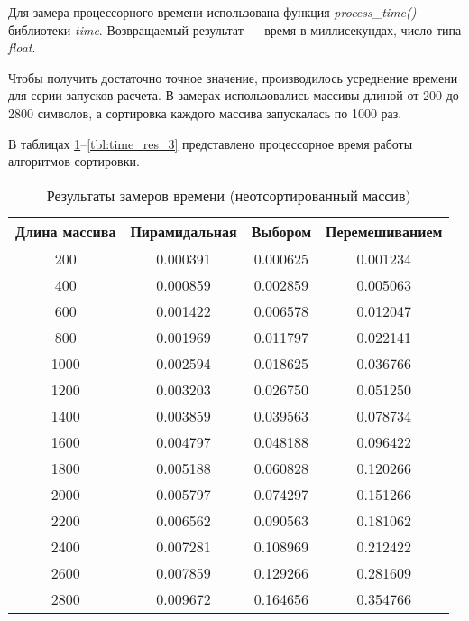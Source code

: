 Для замера процессорного времени использована функция \textit{process\_time()} библиотеки \textit{time}. Возвращаемый результат --- время в миллисекундах, число типа \textit{float}.

Чтобы получить достаточно точное значение, производилось усреднение времени для серии запусков расчета. В замерах использовались массивы длиной от 200 до 2800 символов, а сортировка каждого массива запускалась по 1000 раз.

В таблицах \ref{tbl:time_res_1}--\ref{tbl:time_res_3} представлено процессорное время работы алгоритмов сортировки.

\begin{table}[h]
    \begin{center}
        \begin{threeparttable}
        \captionsetup{justification=raggedright,singlelinecheck=off}
        \caption{\label{tbl:time_res_1}Результаты замеров времени (неотсортированный массив)}
        \begin{tabular}{|c|c|c|c|}
            \hline
            Длина массива & Пирамидальная & Выбором & Перемешиванием \\
            \hline
            200 & 0.000391 & 0.000625 & 0.001234 \\ 
            \hline
            400 & 0.000859 & 0.002859 & 0.005063 \\ 
            \hline
            600 & 0.001422 & 0.006578 & 0.012047 \\ 
            \hline
            800 & 0.001969 & 0.011797 & 0.022141 \\ 
            \hline
            1000 & 0.002594 & 0.018625 & 0.036766 \\ 
            \hline
            1200 & 0.003203 & 0.026750 & 0.051250 \\ 
            \hline
            1400 & 0.003859 & 0.039563 & 0.078734 \\ 
            \hline
            1600 & 0.004797 & 0.048188 & 0.096422 \\ 
            \hline
            1800 & 0.005188 & 0.060828 & 0.120266 \\ 
            \hline
            2000 & 0.005797 & 0.074297 & 0.151266 \\ 
            \hline
            2200 & 0.006562 & 0.090563 & 0.181062 \\ 
            \hline
            2400 & 0.007281 & 0.108969 & 0.212422 \\ 
            \hline
            2600 & 0.007859 & 0.129266 & 0.281609 \\ 
            \hline
            2800 & 0.009672 & 0.164656 & 0.354766 \\ 
            \hline
		\end{tabular}
    \end{threeparttable}
\end{center}
\end{table}


